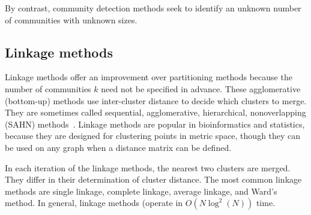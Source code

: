 By contrast, community detection methods seek to identify an unknown number of communities with unknown sizes.

\subsection{Linkage methods} \label{sec:linkage}

Linkage methods offer an improvement over partitioning methods because the number of communities $k$ need not be specified in advance. These agglomerative (bottom-up) methods use inter-cluster distance to decide which clusters to merge. They are sometimes called sequential, agglomerative, hierarchical, nonoverlapping (SAHN) methods~\cite{day1984efficient}. Linkage methods are popular in bioinformatics and statistics, because they are designed for clustering points in metric space, though they can be used on any graph when a distance matrix can be defined.

 In each iteration of the linkage methods, the nearest two clusters are merged. They differ in their determination of cluster distance. The most common linkage methods are single linkage, complete linkage, average linkage, and Ward's method. In general, linkage methods (operate in $O(N\log^2(N))$ time.

